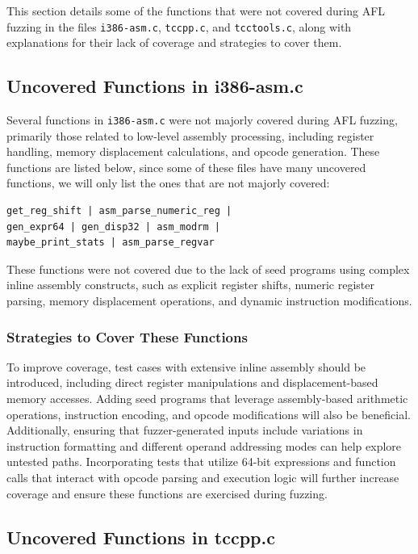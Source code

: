 \documentclass[conference]{IEEEtran}
\begin{document}
This section details some of the functions that were not covered during AFL fuzzing in the files \texttt{i386-asm.c}, \texttt{tccpp.c}, and \texttt{tcctools.c}, along with explanations for their lack of coverage and strategies to cover them.

\subsection{Uncovered Functions in i386-asm.c}

Several functions in \texttt{i386-asm.c} were not majorly covered during AFL fuzzing, primarily those related to low-level assembly processing, including register handling, memory displacement calculations, and opcode generation. These functions are listed below, since some of these files have many uncovered functions, we will only list the ones that are not majorly covered:

\begin{verbatim}
get_reg_shift | asm_parse_numeric_reg | 
gen_expr64 | gen_disp32 | asm_modrm |
maybe_print_stats | asm_parse_regvar
\end{verbatim}

These functions were not covered due to the lack of seed programs using complex inline assembly constructs, such as explicit register shifts, numeric register parsing, memory displacement operations, and dynamic instruction modifications.

\subsubsection{Strategies to Cover These Functions}

To improve coverage, test cases with extensive inline assembly should be introduced, including direct register manipulations and displacement-based memory accesses. Adding seed programs that leverage assembly-based arithmetic operations, instruction encoding, and opcode modifications will also be beneficial. Additionally, ensuring that fuzzer-generated inputs include variations in instruction formatting and different operand addressing modes can help explore untested paths. Incorporating tests that utilize 64-bit expressions and function calls that interact with opcode parsing and execution logic will further increase coverage and ensure these functions are exercised during fuzzing.

\subsection{Uncovered Functions in tccpp.c}
\end{document}
